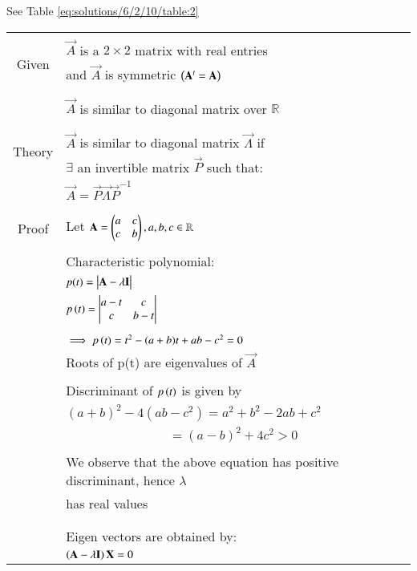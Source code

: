 See Table     \ref{eq:solutions/6/2/10/table:2}

\onecolumn
%
\begin{longtable}{|c|l|}
    \hline
	\multirow{5}{*}{Given} 
	& \\
	& $\vec{A}$ is a $2\times2$ matrix with real entries\\
	& and $\vec{A}$ is symmetric $\left(\mathbf{A}^t=\mathbf{A}\right)$\\
	&\\
	\hline
	\multirow{3}{*}{To Prove} 
	&\\
	& $\vec{A}$ is similar to diagonal matrix over $\mathbb{R}$\\
	&\\
	\hline
	\multirow{3}{*}{Theory} & \\
	& $\vec{A}$ is similar to diagonal matrix $\vec{\Lambda}$ if\\
	&$\exists$ an invertible matrix $\vec{P}$ such that:\\
	& $\vec{A}=\vec{P}\vec{\Lambda} \vec{P}^{-1}$\\
	&\\
	\hline
	\multirow{3}{*}{Proof} & \\
	& Let $\mathbf{A}=\begin{pmatrix}a&c\\c&b\end{pmatrix}, a,b,c \in \mathbb{R}$\\
	&\\
	& Characteristic polynomial:\\
	& $p(t)=\begin{vmatrix}\mathbf{A}-\lambda\mathbf{I}\end{vmatrix}$\\
	& $p\left(t\right)=\begin{vmatrix}a-t&c\\c&b-t\end{vmatrix}$\\
	&\\
	& $\implies p\left(t\right)=t^2-(a+b)t+ab-c^2=0$\\
	& Roots of p(t) are eigenvalues of $\vec{A}$\\
	&\\
	& Discriminant of $p\left(t\right)$ is given by\\
	& $(a+b)^2-4(ab-c^2)=a^2+b^2-2ab+c^2$\\
	& $\qquad\qquad\qquad\qquad=(a-b)^2+4c^2>0$\\
	&\\
	& We observe that the above equation has positive discriminant, hence $\lambda$ \\
	& has real values\\
	&\\
	\hline 
	&\\
	& Eigen vectors are obtained by:\\
	& $\left(\mathbf{A}-\lambda \mathbf{I}\right)\mathbf{X}=0$\\

\end{longtable}
